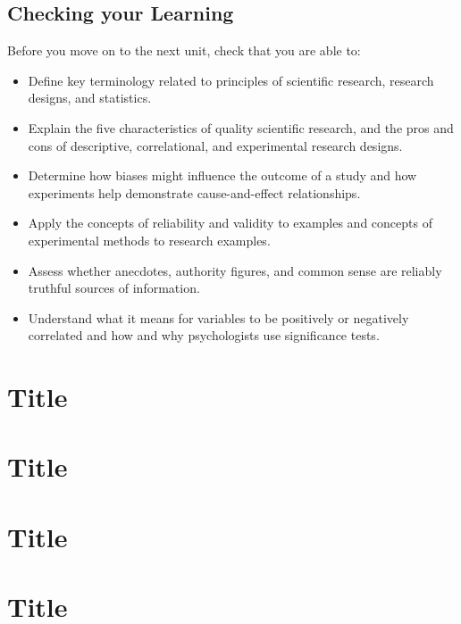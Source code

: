 \documentclass[
]{book}
\providecommand{\tightlist}{%
  \setlength{\itemsep}{0pt}\setlength{\parskip}{0pt}}
\begin{document}
\hypertarget{checking-your-learning}{%
\section*{Checking your Learning}\label{checking-your-learning}}

\begin{progress}
Before you move on to the next unit, check that you are able to:

\begin{itemize}
\tightlist
\item
  Define key terminology related to principles of scientific research, research designs, and statistics.
\item
  Explain the five characteristics of quality scientific research, and the pros and cons of descriptive, correlational, and experimental research designs.
\item
  Determine how biases might influence the outcome of a study and how experiments help demonstrate cause-and-effect relationships.
\item
  Apply the concepts of reliability and validity to examples and concepts of experimental methods to research examples.
\item
  Assess whether anecdotes, authority figures, and common sense are reliably truthful sources of information.
\item
  Understand what it means for variables to be positively or negatively correlated and how and why psychologists use significance tests.
\end{itemize}
\end{progress}

\hypertarget{title}{%
\chapter{Title}\label{title}}

\hypertarget{title-1}{%
\chapter{Title}\label{title-1}}

\hypertarget{title-2}{%
\chapter{Title}\label{title-2}}

\hypertarget{title-3}{%
\chapter{Title}\label{title-3}}
\end{document}
